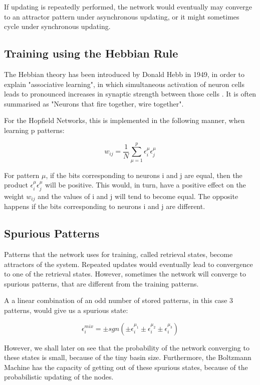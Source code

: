 If updating is repeatedly performed, the network would eventually may converge to an attractor pattern under asynchronous updating, or it might sometimes cycle under synchronous updating. 

\subsection{Training using the Hebbian Rule}

The Hebbian theory has been introduced by Donald Hebb in 1949, in order to explain "associative learning", in which simultaneous activation of neuron cells leads to pronounced increases in synaptic strength between those cells \cite{hebb_wiki}. It is often summarised as "Neurons that fire together, wire together".

For the Hopfield Networks, this is implemented in the following manner, when learning p patterns:

\[ w_{ij}=\frac{1}{N}\sum_{\mu=1}^{p}\epsilon_{i}^\mu \epsilon_{j}^\mu \]

For pattern \(\mu\), if the bits corresponding to neurons i and j are equal, then the product  \( \epsilon_{i}^\mu \epsilon_{j}^\mu \) will be positive. This would, in turn, have a positive effect on the weight \(w_{ij} \) and the values of i and j will tend to become equal. The opposite happens if the bits corresponding to neurons i and j are different.

\subsection{Spurious Patterns}
\label{spurious_patterns}
Patterns that the network uses for training, called retrieval states, become attractors of the system. Repeated updates would eventually lead to convergence to one of the retrieval states. However, sometimes the network will converge to spurious patterns, that are different from the training patterns. 

A a linear combination of an odd number of stored patterns, in this case 3 patterns, would give us a spurious state:

\[ \epsilon_{i}^{mix} = \pm sgn(\pm \epsilon_{i}^{\mu_{1}} 
			         \pm \epsilon_{i}^{\mu_{2}}
			         \pm \epsilon_{i}^{\mu_{3}}) \]

However, we shall later on see that the probability of the network converging to these states is small, because of the tiny basin size. Furthermore, the Boltzmann Machine has the capacity of getting out of these spurious states, because of the probabilistic updating of the nodes.


